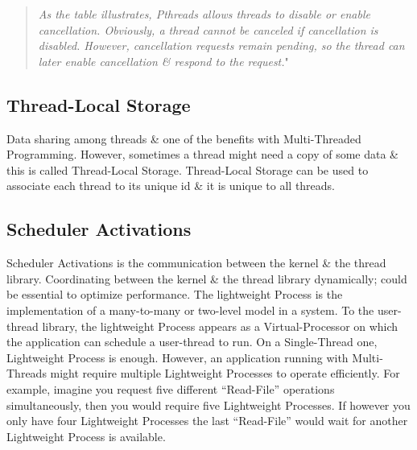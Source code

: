 \documentclass[a4paper,11pt]{article}
\begin{document}
\begin{quotation}
\emph{As the table illustrates, Pthreads allows threads to disable or enable cancellation. Obviously, a thread cannot be canceled if cancellation is disabled. However, cancellation requests remain pending, so the thread can later enable cancellation \& respond to the request.}" \cite{Operatingsystemconcepts}
\end{quotation}
\subsection{Thread-Local Storage}
Data sharing among threads \& one of the benefits with Multi-Threaded Programming. However, sometimes a thread might need a copy of some data \& this is called Thread-Local Storage. Thread-Local Storage can be used to associate each thread to its unique id \& it is unique to all threads.\cite{Operatingsystemconcepts}
\subsection{Scheduler Activations}
Scheduler Activations is the communication between the kernel \& the thread library. Coordinating between the kernel \& the thread library dynamically; could be essential to optimize performance.\cite{Operatingsystemconcepts}
\newline\indent The lightweight Process is the implementation of a many-to-many or two-level model in a system. To the user-thread library, the lightweight Process appears as a Virtual-Processor on which the application can schedule a user-thread to run.\cite{Operatingsystemconcepts}
\newline\indent On a Single-Thread one, Lightweight Process is enough. However, an application running with Multi-Threads might require multiple Lightweight Processes to operate efficiently. For example, imagine you request five different “Read-File” operations simultaneously, then you would require five Lightweight Processes. If however you only have four Lightweight Processes the last “Read-File” would wait for another Lightweight Process is available.\cite{Operatingsystemconcepts}
\end{document}
